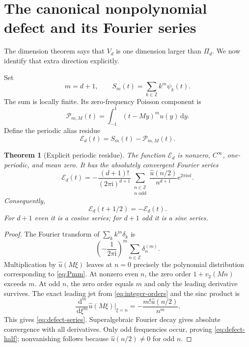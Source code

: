 \documentclass[11pt,oneside]{article}
\newtheorem{theorem}{Theorem}[section]
\theoremstyle{definition}
\theoremstyle{remark}
\newcommand{\Z}{\mathbb Z}
\newcommand{\e}{\mathrm e}
\newcommand{\ii}{\mathrm i}
\newcommand{\dd}{\,\mathrm d}
\newcommand{\vtwo}{v_2}
\begin{document}
\section{The canonical nonpolynomial defect and its Fourier series}
\label{sec:defect}

The dimension theorem says that $V_d$ is one dimension larger than $\Pi_d$.  We now identify that extra direction explicitly.

Set
\begin{equation}
 m=d+1,
 \qquad
 S_m(t)=\sum_{k\in\Z}k^m\psi_k(t).                        \label{eq:Sm}
\end{equation}
The sum is locally finite.  Its zero-frequency Poisson component is
\begin{equation}
 \mathcal P_{m,M}(t)=\int_{-1}^{1}(t-My)^m u(y)\dd y.     \label{eq:Pmm}
\end{equation}
Define the periodic alias residue
\begin{equation}
 \mathcal E_d(t)=S_m(t)-\mathcal P_{m,M}(t).              \label{eq:Edef}
\end{equation}

\begin{theorem}[Explicit periodic residue]
\label{thm:defect-Fourier}
The function $\mathcal E_d$ is nonzero, $C^\infty$, one-periodic, and mean zero.  It has the absolutely convergent Fourier series
\begin{equation}
 \boxed{
 \mathcal E_d(t)=
 -\frac{(d+1)!}{(2\pi\ii)^{d+1}}
 \sum_{\substack{n\in\Z\\ n\text{ odd}}}
 \frac{\widehat u(n/2)}{n^{d+1}}\e^{2\pi\ii nt}.}       \label{eq:defect-series}
\end{equation}
Consequently,
\begin{equation}
 \mathcal E_d(t+1/2)=-\mathcal E_d(t).                    \label{eq:defect-half}
\end{equation}
For $d+1$ even it is a cosine series; for $d+1$ odd it is a sine series.
\end{theorem}

\begin{proof}
The Fourier transform of $\sum_k k^m\delta_k$ is
\[
 \left(-\frac1{2\pi\ii}\right)^m
 \sum_{n\in\Z}\delta_n^{(m)}.
\]
Multiplication by $\widehat u(M\xi)$ leaves at $n=0$ precisely the polynomial distribution corresponding to \eqref{eq:Pmm}.  At nonzero even $n$, the zero order $1+\vtwo(Mn)$ exceeds $m$.  At odd $n$, the zero order equals $m$ and only the leading derivative survives.  The exact leading jet from \eqref{eq:integer-orders} and the sinc product is
\[
 \frac{\dd^m}{\dd\xi^m}\widehat u(M\xi)\bigg|_{\xi=n}
 =-\frac{m!\widehat u(n/2)}{n^m}.
\]
This gives \eqref{eq:defect-series}.  Superalgebraic Fourier decay gives absolute convergence with all derivatives.  Only odd frequencies occur, proving \eqref{eq:defect-half}; nonvanishing follows because $\widehat u(n/2)\ne0$ for odd $n$.
\end{proof}
\end{document}
